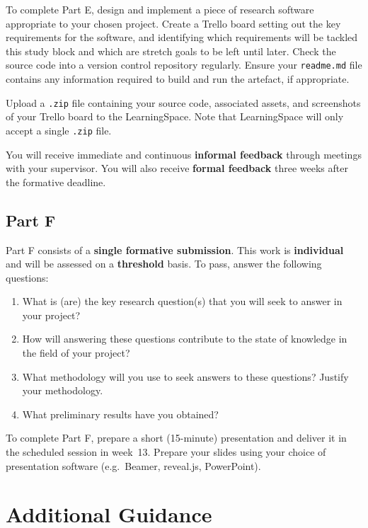 To complete Part E, design and implement a piece of research software appropriate to your chosen project.
Create a Trello board setting out the key requirements for the software,
and identifying which requirements will be tackled this study block
and which are stretch goals to be left until later.
Check the source code into a version control repository regularly.
Ensure your \texttt{readme.md} file contains any information required to build and run the artefact, if appropriate.

Upload a \texttt{.zip} file containing your source code, associated assets, and screenshots of your Trello board to the LearningSpace.
Note that LearningSpace will only accept a single \texttt{.zip} file.

You will receive immediate and continuous \textbf{informal feedback} through meetings with your supervisor.
You will also receive \textbf{formal feedback} three weeks after the formative deadline.

\subsection*{Part F}

Part F consists of a \textbf{single formative submission}.
This work is \textbf{individual} and will be assessed on a \textbf{threshold} basis.
To pass, answer the following questions:

\begin{enumerate}[label=(\roman*)]
	\item What is (are) the key research question(s) that you will seek to
		answer in your project?
	\item How will answering these questions contribute to the state of knowledge
		in the field of your project?
	\item What methodology will you use to seek answers to these questions?
		Justify your methodology.
	\item What preliminary results have you obtained?
\end{enumerate}

To complete Part F, prepare a short (15-minute) presentation 
and deliver it in the scheduled session in week~13.
Prepare your slides using your choice of presentation software
(e.g.\ Beamer, reveal.js, PowerPoint).

\section*{Additional Guidance}

